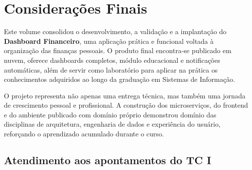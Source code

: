 \chapter{\label{chap:chap6}Considerações Finais}

Este volume consolidou o desenvolvimento, a validação e a implantação do \textbf{Dashboard Financeiro}, uma aplicação prática e funcional voltada à organização das finanças pessoais. O produto final encontra-se publicado em nuvem, oferece dashboards completos, módulo educacional e notificações automáticas, além de servir como laboratório para aplicar na prática os conhecimentos adquiridos ao longo da graduação em Sistemas de Informação.

O projeto representa não apenas uma entrega técnica, mas também uma jornada de crescimento pessoal e profissional. A construção dos microserviços, do frontend e do ambiente publicado com domínio próprio demonstrou domínio das disciplinas de arquitetura, engenharia de dados e experiência do usuário, reforçando o aprendizado acumulado durante o curso.

\section{Atendimento aos apontamentos do TC I}


